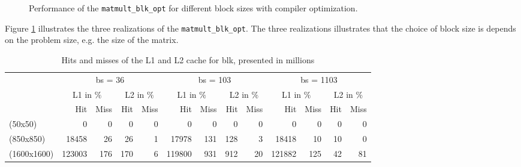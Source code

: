 \begin{figure}[!th]
\centering
{}
\caption{Performance of the \texttt{matmult\_blk\_opt} for different block sizes with compiler optimization.}
\label{fig:opt_blk_1}
\end{figure}

Figure \ref{fig:opt_blk_1} illustrates the three realizations of the  \texttt{matmult\_blk\_opt}. The three realizations illustrates that the choice of block size is depends on the problem size, e.g. the size of the matrix.


\begin{table}[!th]
\centering
\begin{tabular}{l|rr|rr|rr|rr|rr|rr}
\multirow{3}{*}{} & \multicolumn{4}{|c}{bs = 36}& \multicolumn{4}{|c}{bs = 103} & \multicolumn{4}{|c}{bs = 1103}\\
& \multicolumn{2}{|c}{L1 in $\%$} & \multicolumn{2}{|c}{L2 in $\%$}& \multicolumn{2}{|c}{L1 in $\%$} & \multicolumn{2}{|c}{L2 in $\%$}& \multicolumn{2}{|c}{L1 in $\%$} & \multicolumn{2}{|c}{L2 in $\%$} \\
& Hit& Miss& Hit& Miss& Hit& Miss& Hit& Miss & Hit & Miss & Hit & Miss\\ \hline
(50x50)&0 & 0 & 0 & 0 & 0 & 0 & 0 & 0 & 0 & 0 & 0 & 0\\
(850x850)& 18458 & 26 & 26 & 1 & 17978 & 131 & 128 & 3 & 18418 & 10 & 10 & 0\\
(1600x1600)& 123003 & 176 & 170 & 6 & 119800 & 931 & 912 & 20 & 121882 & 125 & 42 & 81\\
\end{tabular}
\caption{Hits and misses of the L1 and L2 cache for blk, presented in millions}
\label{tab:L1L2hitmis_lib}
\end{table}


